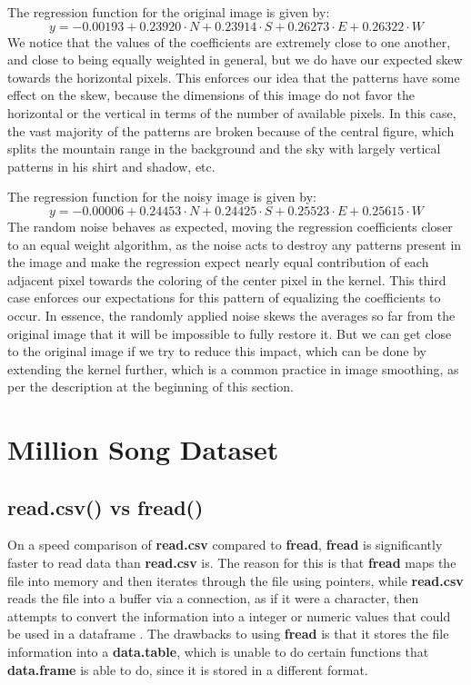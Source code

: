 \documentclass{article}
\begin{document}
The regression function for the original image is given by:
\begin{equation}
y = -0.00193 + 0.23920 \cdot N + 0.23914 \cdot S + 0.26273 \cdot E + 0.26322 \cdot W
\end{equation}
We notice that the values of the coefficients are extremely close to one another, and close to being equally weighted in general, but we do have our expected skew towards the horizontal pixels.  This enforces our idea that the patterns have some effect on the skew, because the dimensions of this image do not favor the horizontal or the vertical in terms of the number of available pixels.  In this case, the vast majority of the patterns are broken because of the central figure, which splits the mountain range in the background and the sky with largely vertical patterns in his shirt and shadow, etc.

The regression function for the noisy image is given by:
\begin{equation}
y = -0.00006 + 0.24453 \cdot N + 0.24425 \cdot S + 0.25523 \cdot E + 0.25615 \cdot W
\end{equation}
The random noise behaves as expected, moving the regression coefficients closer to an equal weight algorithm, as the noise acts to destroy any patterns present in the image and make the regression expect nearly equal contribution of each adjacent pixel towards the coloring of the center pixel in the kernel.  This third case enforces our expectations for this pattern of equalizing the coefficients to occur.  In essence, the randomly applied noise skews the averages so far from the original image that it will be impossible to fully restore it.  But we can get close to the original image if we try to reduce this impact, which can be done by extending the kernel further, which is a common practice in image smoothing, as per the description at the beginning of this section.

\newpage
\section{Million Song Dataset}

\subsection{read.csv() vs fread()}

On a speed comparison of \textbf{read.csv} compared to \textbf{fread}, \textbf{fread} is significantly faster to read data than \textbf{read.csv} is. The reason for this is that \textbf{fread} maps the file into memory and then iterates through the file using pointers, while \textbf{read.csv} reads the file into a buffer via a connection, as if it were a character, then attempts to convert the information into a integer or numeric values that could be used in a dataframe \cite{data-table-faq, fread-speed}. The drawbacks to using \textbf{fread} is that it stores the file information into a \textbf{data.table}, which is unable to do certain functions that \textbf{data.frame} is able to do, since it is stored in a different format.
\end{document}
